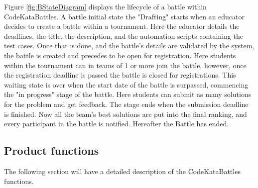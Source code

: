 Figure \ref{fig:BStateDiagram} displays the lifecycle of a battle within CodeKataBattles. A battle initial state the "Drafting" starts when an educator decides to create a battle within a tournament. Here the educator details the deadlines, the title, the description, and the automation scripts containing the test cases. Once that is done, and the battle's details are validated by the system, the battle is created and precedes to be open for registration. Here students within the tournament can in teams of 1 or more join the battle, however, once the registration deadline is passed the battle is closed for registrations. This waiting state is over when the start date of the battle is surpassed, commencing the "in progress" stage of the battle. Here students can submit as many solutions for the problem and get feedback. The stage ends when the submission deadline is finished. Now all the team's best solutions are put into the final ranking, and every participant in the battle is notified. Hereafter the Battle has ended.  
\subsection{Product functions}

The following section will have a detailed description of the CodeKataBattles functions. 


